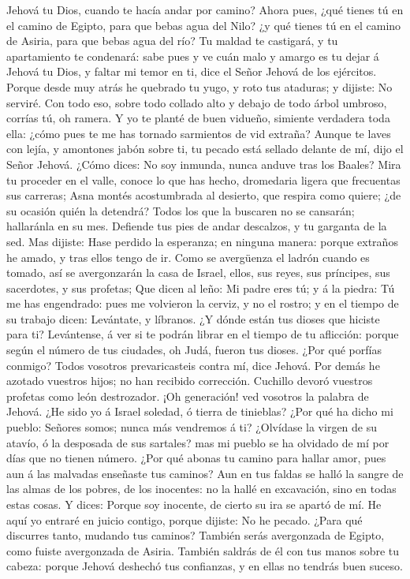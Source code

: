 Jehová tu Dios, cuando te hacía andar por camino?  Ahora
pues, ¿qué tienes tú en el camino de Egipto, para que bebas agua del
Nilo? ¿y qué tienes tú en el camino de Asiria, para que bebas agua del
río?  Tu maldad te castigará, y tu apartamiento te
condenará: sabe pues y ve cuán malo y amargo es tu dejar á Jehová tu
Dios, y faltar mi temor en ti, dice el Señor Jehová de los ejércitos.
 Porque desde muy atrás he quebrado tu yugo, y roto tus
ataduras; y dijiste: No serviré. Con todo eso, sobre todo collado alto y
debajo de todo árbol umbroso, corrías tú, oh ramera.  Y
yo te planté de buen vidueño, simiente verdadera toda ella: ¿cómo pues
te me has tornado sarmientos de vid extraña?  Aunque te
laves con lejía, y amontones jabón sobre ti, tu pecado está sellado
delante de mí, dijo el Señor Jehová.  ¿Cómo dices: No soy
inmunda, nunca anduve tras los Baales? Mira tu proceder en el valle,
conoce lo que has hecho, dromedaria ligera que frecuentas sus carreras;
 Asna montés acostumbrada al desierto, que respira como
quiere; ¿de su ocasión quién la detendrá? Todos los que la buscaren no
se cansarán; hallaránla en su mes.  Defiende tus pies de
andar descalzos, y tu garganta de la sed. Mas dijiste: Hase perdido la
esperanza; en ninguna manera: porque extraños he amado, y tras ellos
tengo de ir.  Como se avergüenza el ladrón cuando es
tomado, así se avergonzarán la casa de Israel, ellos, sus reyes, sus
príncipes, sus sacerdotes, y sus profetas;  Que dicen al
leño: Mi padre eres tú; y á la piedra: Tú me has engendrado: pues me
volvieron la cerviz, y no el rostro; y en el tiempo de su trabajo dicen:
Levántate, y líbranos.  ¿Y dónde están tus dioses que
hiciste para ti? Levántense, á ver si te podrán librar en el tiempo de
tu aflicción: porque según el número de tus ciudades, oh Judá, fueron
tus dioses.  ¿Por qué porfías conmigo? Todos vosotros
prevaricasteis contra mí, dice Jehová.  Por demás he
azotado vuestros hijos; no han recibido corrección. Cuchillo devoró
vuestros profetas como león destrozador.  ¡Oh generación!
ved vosotros la palabra de Jehová. ¿He sido yo á Israel soledad, ó
tierra de tinieblas? ¿Por qué ha dicho mi pueblo: Señores somos; nunca
más vendremos á ti?  ¿Olvídase la virgen de su atavío, ó
la desposada de sus sartales? mas mi pueblo se ha olvidado de mí por
días que no tienen número.  ¿Por qué abonas tu camino
para hallar amor, pues aun á las malvadas enseñaste tus caminos?
 Aun en tus faldas se halló la sangre de las almas de los
pobres, de los inocentes: no la hallé en excavación, sino en todas estas
cosas.  Y dices: Porque soy inocente, de cierto su ira se
apartó de mí. He aquí yo entraré en juicio contigo, porque dijiste: No
he pecado.  ¿Para qué discurres tanto, mudando tus
caminos? También serás avergonzada de Egipto, como fuiste avergonzada de
Asiria.  También saldrás de él con tus manos sobre tu
cabeza: porque Jehová deshechó tus confianzas, y en ellas no tendrás
buen suceso.

